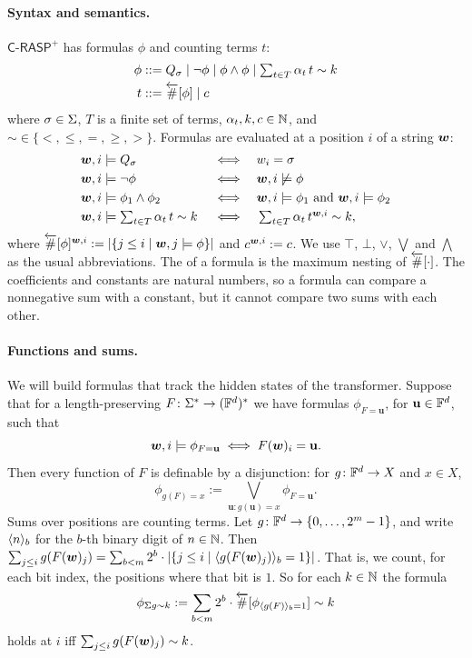 \paragraph{Syntax and semantics.}
$\mathsf{C\text{-}RASP}^+$ has formulas $\phi$ and counting terms $t$:
\begin{align*}
\phi &\mathrel{::=} Q_\sigma \mid \lnot\phi \mid \phi\land\phi \mid \textstyle\sum_{t\in T}\alpha_t\, t\sim k \\
t &\mathrel{::=} \overleftarrow{\#}[\phi] \mid c
\end{align*}
where $\sigma\in{{ \Sigma}}$, $T$ is a finite set of terms, $\alpha_t,k,c\in{{ \mathbb{N}}}$, and ${\sim}\in\{<,\leq,=,\geq,>\}$.
Formulas are evaluated at a position $i$ of a string ${{\boldsymbol{w}}}$:
\begin{align*}
{{\boldsymbol{w}}},i&\models Q_\sigma &&\iff && w_i=\sigma\\
{{\boldsymbol{w}}},i&\models \lnot\phi &&\iff && {{\boldsymbol{w}}},i\not\models\phi\\
{{\boldsymbol{w}}},i&\models \phi_1\land\phi_2 &&\iff && {{\boldsymbol{w}}},i\models\phi_1 \text{ and } {{\boldsymbol{w}}},i\models\phi_2\\
{{\boldsymbol{w}}},i&\models \textstyle\sum_{t\in T}\alpha_t\, t\sim k &&\iff && \textstyle\sum_{t\in T}\alpha_t\, t^{{{\boldsymbol{w}}},i}\sim k,
\end{align*}
where $\overleftarrow{\#}[\phi]^{{{\boldsymbol{w}}},i} := |\{j\leq i \mid {{\boldsymbol{w}}},j\models\phi\}|$ and $c^{{{\boldsymbol{w}}},i} := c$.
We use $\top$, $\bot$, $\lor$, $\bigvee$ and $\bigwedge$ as the usual abbreviations.
The  of a formula is the maximum nesting of $\overleftarrow{\#}[\cdot]$.
The coefficients and constants are natural numbers, so a formula can compare a nonnegative sum with a constant,
but it cannot compare two sums with each other.

\paragraph{Functions and sums.}
We will build formulas that track the hidden states of the transformer.
Suppose that for a length-preserving $F\colon{{ \Sigma}}^*\to(\mathbb{F}^d)^*$ we have formulas
$\phi_{F=\mathbf{u}}$, for $\mathbf{u}\in\mathbb{F}^d$, such that
\[
{{\boldsymbol{w}}},i\models\phi_{F=\mathbf{u}} \iff F({{\boldsymbol{w}}})_i=\mathbf{u}.
\]
Then every function of $F$ is definable by a disjunction: for $g\colon\mathbb{F}^d\to X$ and $x\in X$,
\begin{equation}
\phi_{g(F)=x} := \bigvee_{\mathbf{u}\colon g(\mathbf{u})=x}\phi_{F=\mathbf{u}}.
\label{eq:crasp_pointwise}
\end{equation}
Sums over positions are counting terms. Let $g\colon\mathbb{F}^d\to\{0,\ldots,2^m-1\}$, and write $\langle n\rangle_{b}$ for the $b$-th binary digit of $n\in{{ \mathbb{N}}}$.
Then $\sum_{j\leq i}g(F({{\boldsymbol{w}}})_j) = \sum_{b<m}2^b\cdot|\{j\leq i\mid \langle g(F({{\boldsymbol{w}}})_j)\rangle_{b}=1\}|$.
That is, we count, for each bit index, the positions where that bit is $1$. So for each $k\in{{ \mathbb{N}}}$ the formula
\begin{equation}
\phi_{\Sigma g\sim k} := \sum_{b<m}2^b\cdot\overleftarrow{\#}[\phi_{\langle g(F)\rangle_{b}=1}]\sim k
\label{eq:crasp_sum}
\end{equation}
holds at $i$ iff $\sum_{j\leq i}g(F({{\boldsymbol{w}}})_j)\sim k$.

